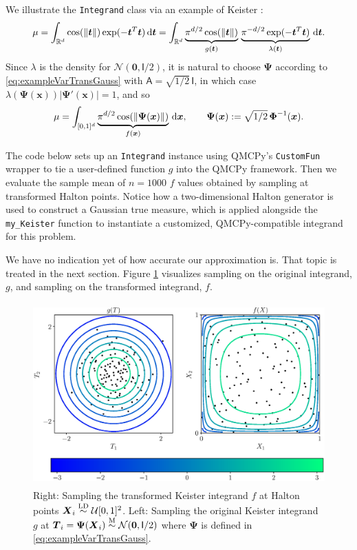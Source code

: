 \documentclass[graybox]{svmult}
\begin{document}
We illustrate the \texttt{Integrand} class via an example of Keister \cite{Kei96}:
\begin{equation} \label{eq:KeisterIntegral}
	\mu 
	= \int_{\mathbb{R}^d} \cos(\lVert \boldsymbol{t} \rVert) \exp(-\boldsymbol{t}^T \boldsymbol{t}) \, \D \boldsymbol{t} \\ 
	= \int_{\mathbb{R}^d} \underbrace{\pi^{d/2} \cos(\lVert \boldsymbol{t} \rVert)}_{g(\boldsymbol{t})}\, \underbrace{\pi^{-d/2} \exp(-\boldsymbol{t}^T \boldsymbol{t}) }_{\lambda(\boldsymbol{t})} \, \D \boldsymbol{t}.
\end{equation}
Since $\lambda$ is the density for $\mathcal{N}(\boldsymbol{0},\mathsf{I}/2)$, it is natural to choose $\boldsymbol{\Psi}$ according to \eqref{eq:exampleVarTransGauss} with $\mathsf{A} = \sqrt{1/2} \, \mathsf{I}$, in which case $\lambda(\boldsymbol{\Psi}(\boldsymbol{x})) \lvert \boldsymbol{\Psi}'(\boldsymbol{x})\rvert  = 1$, and so 
\[
\mu = \int_{[0,1]^d} \underbrace{\pi^{d/2} \cos(\lVert \boldsymbol{\Psi}(\boldsymbol{x}) \rVert)}_{f(\boldsymbol{x})} \, \mathrm{d} \boldsymbol{x}, \qquad 
\boldsymbol{\Psi}(\boldsymbol{x}) := \sqrt{1/2} \,\boldsymbol{\Phi}^{-1}(\boldsymbol{x}).
\]

The code below sets up an \texttt{Integrand} instance using QMCPy's \texttt{CustomFun} wrapper to tie a user-defined function $g$ into the QMCPy framework.  Then we evaluate the sample mean of $n=1000$ $f$ values obtained by sampling at transformed Halton points. Notice how a two-dimensional Halton generator is used to construct a Gaussian true measure, which is applied alongside the \texttt{my\_Keister} function to instantiate a customized, QMCPy-compatible integrand for this problem.

We have no indication yet of how accurate our approximation is.  That topic is treated in the next section.  Figure \ref{fig:ikc} visualizes sampling on the original integrand, $g$, and sampling on the transformed integrand, $f$. 

\begin{figure}[t]
	\includegraphics[height=7cm]{QMCSoftwareArticle/vfigs/i_keister_contours.eps}
	\caption{Right: Sampling the transformed Keister integrand $f$ at Halton points $\boldsymbol{X}_i \overset{\textup{LD}}{\sim} \mathcal{U}[0,1]^2$. Left: Sampling the original Keister integrand $g$ at $\boldsymbol{T}_i = \boldsymbol{\Psi}(\boldsymbol{X}_i) \overset{\textup{M}}{\sim} \mathcal{N}(\boldsymbol{0},\mathsf{I}/2)$ where $\boldsymbol{\Psi}$ is defined in \eqref{eq:exampleVarTransGauss}.  } \label{fig:ikc}
\end{figure}
\end{document}
